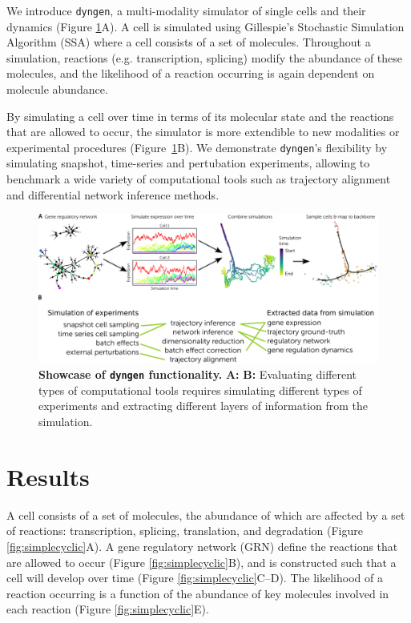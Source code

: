 We introduce \texttt{dyngen}, a multi-modality simulator of single cells and their dynamics (Figure \ref{fig:showcase}A). A cell is simulated using Gillespie's Stochastic Simulation Algorithm (SSA) \cite{gillespie_exactstochasticsimulation_1977} where a cell consists of a set of molecules. Throughout a simulation, reactions (e.g. transcription, splicing) modify the abundance of these molecules, and the likelihood of a reaction occurring is again dependent on molecule abundance.

By simulating a cell over time in terms of its molecular state and the reactions that are allowed to occur, the simulator is more extendible to new modalities or experimental procedures (Figure~\ref{fig:showcase}B). We demonstrate \texttt{dyngen}'s flexibility by simulating snapshot, time-series and pertubation experiments, allowing to benchmark a wide variety of computational tools such as trajectory alignment and differential network inference methods.

\begin{figure}[htb!]
	\centering
	\includegraphics[width=\linewidth]{fig/showcase_4} 
	\caption{
		\textbf{Showcase of \texttt{dyngen} functionality.} 
		\textbf{A:} 
		\textbf{B:} Evaluating different types of computational tools requires simulating different types of experiments and extracting different layers of information from the simulation.
	}
	\label{fig:showcase}
\end{figure}

\section{Results}

A cell consists of a set of molecules, the abundance of which are affected by a set of reactions: transcription, splicing, translation, and degradation (Figure \ref{fig:simplecyclic}A). 
A gene regulatory network (GRN) define the reactions that are allowed to occur (Figure \ref{fig:simplecyclic}B), and is constructed such that a cell will develop over time (Figure \ref{fig:simplecyclic}C--D).
The likelihood of a reaction occurring is a function of the abundance of key molecules involved in each reaction (Figure \ref{fig:simplecyclic}E).

